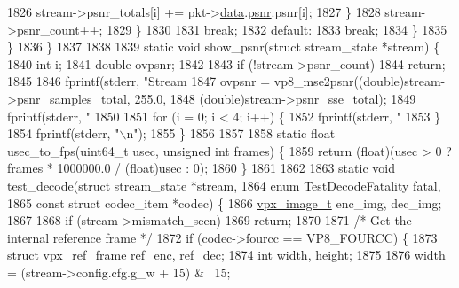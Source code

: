 \begin{DoxyCodeInclude}
{{{{{{{{{{{{{{{{{{{{{{{{{{{{{{{{{{{{{{{{{{{{{{{{{{{1826             stream->psnr\_totals[i] += pkt->\hyperlink{structvpx__codec__cx__pkt_a7f97b060a23b7e89fe5b885c0074f696}{data}.\hyperlink{structvpx__codec__cx__pkt_a63744aeceb50355d6402d55309c151b6}{psnr}.psnr[i];
1827           \}
1828           stream->psnr\_count++;
1829         \}
1830 
1831         \textcolor{keywordflow}{break};
1832       \textcolor{keywordflow}{default}:
1833         \textcolor{keywordflow}{break};
1834     \}
1835   \}
1836 \}
1837 
1838 
1839 \textcolor{keyword}{static} \textcolor{keywordtype}{void} show\_psnr(\textcolor{keyword}{struct} stream\_state  *stream) \{
1840   \textcolor{keywordtype}{int} i;
1841   \textcolor{keywordtype}{double} ovpsnr;
1842 
1843   \textcolor{keywordflow}{if} (!stream->psnr\_count)
1844     \textcolor{keywordflow}{return};
1845 
1846   fprintf(stderr, \textcolor{stringliteral}{"Stream %
1847   ovpsnr = vp8\_mse2psnr((\textcolor{keywordtype}{double})stream->psnr\_samples\_total, 255.0,
1848                         (\textcolor{keywordtype}{double})stream->psnr\_sse\_total);
1849   fprintf(stderr, \textcolor{stringliteral}{" %
1850 
1851   \textcolor{keywordflow}{for} (i = 0; i < 4; i++) \{
1852     fprintf(stderr, \textcolor{stringliteral}{" %
1853   \}
1854   fprintf(stderr, \textcolor{stringliteral}{"\(\backslash\)n"});
1855 \}
1856 
1857 
1858 \textcolor{keyword}{static} \textcolor{keywordtype}{float} usec\_to\_fps(uint64\_t usec, \textcolor{keywordtype}{unsigned} \textcolor{keywordtype}{int} frames) \{
1859   \textcolor{keywordflow}{return} (\textcolor{keywordtype}{float})(usec > 0 ? frames * 1000000.0 / (float)usec : 0);
1860 \}
1861 
1862 
1863 \textcolor{keyword}{static} \textcolor{keywordtype}{void} test\_decode(\textcolor{keyword}{struct} stream\_state  *stream,
1864                         \textcolor{keyword}{enum} TestDecodeFatality fatal,
1865                         \textcolor{keyword}{const} \textcolor{keyword}{struct} codec\_item *codec) \{
1866   \hyperlink{structvpx__image}{vpx\_image\_t} enc\_img, dec\_img;
1867 
1868   \textcolor{keywordflow}{if} (stream->mismatch\_seen)
1869     \textcolor{keywordflow}{return};
1870 
1871   \textcolor{comment}{/* Get the internal reference frame */}
1872   \textcolor{keywordflow}{if} (codec->fourcc == VP8\_FOURCC) \{
1873     \textcolor{keyword}{struct }\hyperlink{structvpx__ref__frame}{vpx\_ref\_frame} ref\_enc, ref\_dec;
1874     \textcolor{keywordtype}{int} width, height;
1875 
1876     width = (stream->config.cfg.g\_w + 15) & ~15;
}}}}}}}}}}}}}}}}}}}}}}}}}}}}}}}}}}}}}}}}}}}}}}}}}}}}}}
\end{DoxyCodeInclude}
